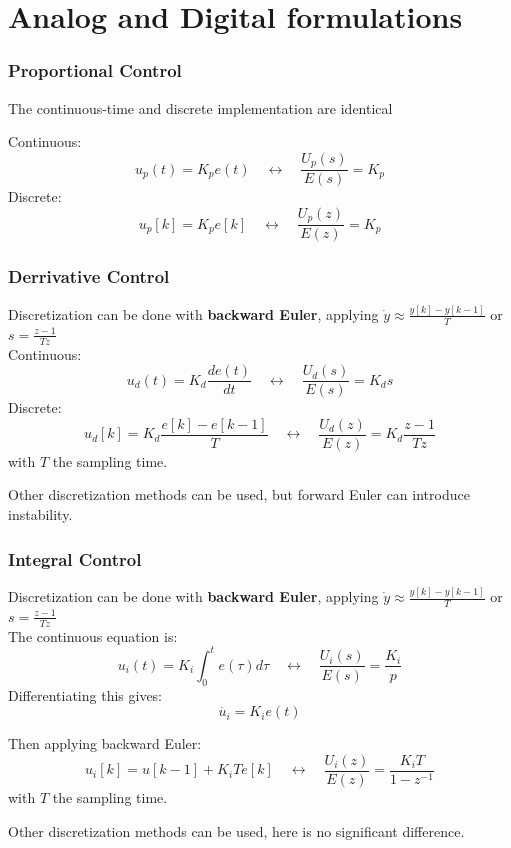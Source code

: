 \section{Analog and Digital formulations}

\begin{frame}
	\frametitle{Proportional Control}
	The continuous-time and discrete implementation are identical
	
	Continuous:
	\begin{equation*}
		u_p(t) = K_p e(t) \quad \leftrightarrow \quad \frac{U_p(s)}{E(s)} = K_p 
	\end{equation*}
	Discrete:
	\begin{equation*}
		u_p[k] = K_p e[k] \quad \leftrightarrow \quad \frac{U_p(z)}{E(z)} = K_p 
	\end{equation*}
\end{frame}

\begin{frame}
	\frametitle{Derrivative Control}
	Discretization can be done with \textbf{backward Euler}, applying $\dot{y} \approx \frac{y[k]-y[k-1]}{T}$ or $s = \frac{z - 1}{Tz}$ \\
	Continuous:
	\begin{equation*}
		u_d(t) = K_d \frac{de(t)}{dt} \quad \leftrightarrow \quad \frac{U_d(s)}{E(s)} = K_d s 
	\end{equation*}
	Discrete:
	\begin{equation*}
	u_d[k] = K_d \frac{ e[k] - e[k-1]}{T} \quad \leftrightarrow \quad \frac{U_d(z)}{E(z)} = K_d \frac{z - 1}{Tz}
	\end{equation*}
	with $T$ the sampling time.
	
	Other discretization methods can be used, but forward Euler can introduce instability.
\end{frame}

\begin{frame}
	\frametitle{Integral Control}
	Discretization can be done with \textbf{backward Euler}, applying $\dot{y} \approx \frac{y[k]-y[k-1]}{T}$ or $s = \frac{z - 1}{Tz}$ \\
	The continuous equation is:
	\begin{equation*}
		u_i(t) = K_i \int_0^t e(\tau)d\tau \quad \leftrightarrow \quad \frac{U_i(s)}{E(s)} = \frac{K_i}{p} 
	\end{equation*}
	Differentiating this gives:
	\begin{equation*}
		\dot{u_i} = K_i e(t)
	\end{equation*}
	
	\pause
	Then applying backward Euler:
	\begin{equation*}
	u_i[k] = u[k-1] + K_i T e[k] \quad \leftrightarrow \quad \frac{U_i(z)}{E(z)} =  \frac{K_i T}{1 - z^{-1}}
	\end{equation*}
	with $T$ the sampling time.
	
	Other discretization methods can be used, here is no significant difference.
\end{frame}

